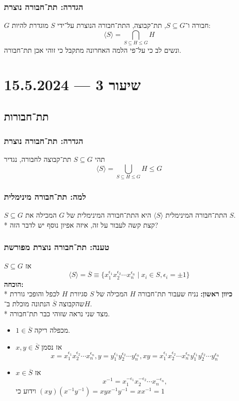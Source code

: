 \subsubsection{הגדרה: תת־חבורה נוצרת}
$G$ חבורה ו־$S \subseteq G$, תת־קבוצה, התת־חבורה הנוצרת על־ידי $S$ מוגדרת להיות:
\[
	\langle S \rangle = \bigcap_{S \subseteq H \le G} H
\]
ונשים לב כי על־פי הלמה האחרונה מתקבל כי זוהי אכן תת־חבורה.

\section{שיעור 3 --- 15.5.2024}
\subsection{תת־חבורות}
\subsubsection{הגדרה: תת־חבורה נוצרת}
תהי $S \subseteq G$ תת־קבוצה לחבורה, נגדיר
\[
	\langle S \rangle = \bigcup_{S \subseteq H \le G} H \le G
\]
\subsubsection{למה: תת־חבורה מינימלית}
$S \subseteq G$ התת־חבורה המינימלית $\langle S \rangle$ היא התת־חבורה המינימלית של $G$ המכילה את $S$. \\*
קצת קשה לעבור על זה, איזה אפיון נוסף יש לדבר הזה?

\subsubsection{טענה: תת־חבורה נוצרת מפורשת}
$S \subseteq G$ אז
\[
	\langle S \rangle = \overline{S} \equiv \{ x_1^{\epsilon_1}x_2^{\epsilon_2} \cdots x_n^{\epsilon_n} \mid x_i \in S, \epsilon_i = \pm 1 \}
\]
\textbf{הוכחה:} \\*
\textbf{כיוון ראשון:}
נניח שעבור תת־חבורה $H$ המכילה של $S$ סגיורת $H$ לכפל והופכי גוררת שהקבוצה $\overline{S}$ הנתונה מוכלת ב־$H$. \\*
מצד שני נראה שזוהי כבר תת־חבורה.
\begin{itemize}
	\item $1 \in \overline{S}$ מכפלה ריקה.
	\item $x, y \in \overline{S}$ אז נסמן
		\[
			x = x_1^{\epsilon_1}x_2^{\epsilon_2} \cdots x_n^{\epsilon_n},
			y = y_1^{\epsilon_1}y_2^{\epsilon_2} \cdots y_n^{\epsilon_n},
			xy = x_1^{\epsilon_1}x_2^{\epsilon_2} \cdots x_n^{\epsilon_n} y_1^{\epsilon_1}y_2^{\epsilon_2} \cdots y_n^{\epsilon_n}
		\]
	\item $x \in \overline{S}$ אז
		\[
			x^{-1} = x_1^{-\epsilon_1}x_2^{-\epsilon_2} \cdots x_n^{-\epsilon_n},
		\]
		וידוע כי $(x y)(x^{-1} y^{-1}) = x y x^{-1} y^{-1} = x x^{-1} = 1$
\end{itemize}

